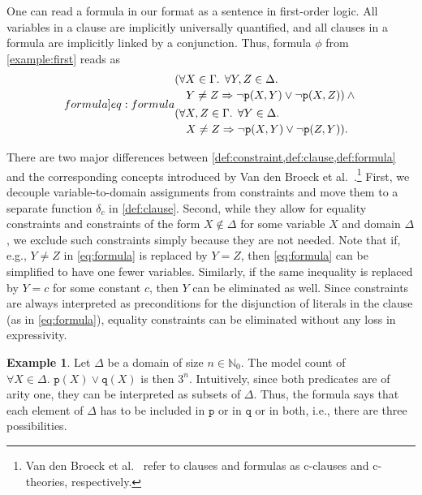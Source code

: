 \documentclass{article}
\theoremstyle{definition}
\newtheorem{example}{Example}
\theoremstyle{remark}
\begin{document}
One can read a formula in our format as a sentence in first-order logic. All
variables in a clause are implicitly universally quantified, and all clauses in
a formula are implicitly linked by a conjunction. Thus, formula $\phi$ from
\cref{example:first} reads as
\begin{equation}\label[formula]{eq:formula}
  \begin{split}
    &\begin{multlined}[t]
      (\forall X \in \Gamma\text{. }\forall Y, Z \in \Delta\text{. }\\
      Y \ne Z \Rightarrow \neg \texttt{p}(X, Y) \lor \neg \texttt{p}(X, Z)) \land{}
    \end{multlined}\\
    &\begin{multlined}[t]
      (\forall X, Z \in \Gamma\text{. }\forall Y \in \Delta\text{. }\\
      X \ne Z \Rightarrow \neg \texttt{p}(X, Y) \lor \neg \texttt{p}(Z, Y)).
    \end{multlined}
  \end{split}
\end{equation}

There are two major differences between
\cref{def:constraint,def:clause,def:formula} and the corresponding concepts
introduced by Van den Broeck et
al.~.\footnote{Van den Broeck et
  al.~ refer to clauses and formulas as
  c-clauses and c-theories, respectively.} First, we decouple variable-to-domain
assignments from constraints and move them to a separate function $\delta_{c}$
in \cref{def:clause}. Second, while they allow for equality constraints and
constraints of the form $X \not\in \Delta$ for some variable $X$ and domain
$\Delta$, we exclude such constraints simply because they are not needed. Note
that if, e.g., $Y \ne Z$ in \cref{eq:formula} is replaced by $Y = Z$, then
\cref{eq:formula} can be simplified to have one fewer variables. Similarly, if
the same inequality is replaced by $Y = c$ for some constant $c$, then $Y$ can
be eliminated as well. Since constraints are always interpreted as preconditions
for the disjunction of literals in the clause (as in \cref{eq:formula}),
equality constraints can be eliminated without any loss in expressivity.

\begin{example}\label{example:simple}
  Let $\Delta$ be a domain of size $n \in \mathbb{N}_{0}$. The model count of
  $\forall X \in \Delta\text{. } \texttt{p}(X) \lor \texttt{q}(X)$ is then
  $3^{n}$. Intuitively, since both predicates are of arity one, they can be
  interpreted as subsets of $\Delta$. Thus, the formula says that each element
  of $\Delta$ has to be included in $\texttt{p}$ or in $\texttt{q}$ or in both,
  i.e., there are three possibilities.
\end{example}
\end{document}
